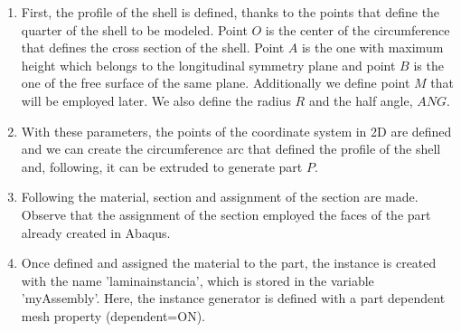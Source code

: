 \documentclass[english,a4paper,12pt]{article}
\begin{document}
\begin{enumerate}
\item
First, the profile of the shell is defined, thanks to the points that define the quarter of the shell to be modeled.
Point $O$ is the center of the circumference that defines the cross section of the shell. Point $A$ is the one with maximum height which belongs to the longitudinal symmetry plane and point $B$ is the one of the free surface of the same plane. Additionally we define point $M$ that will be employed later. We also define the radius $R$ and the half angle, $ANG$.
\item
With these parameters, the points of the coordinate system in 2D are defined and we can create the circumference arc that defined the profile of the shell and, following, it can be extruded to generate part $P$.
\item
Following the material, section and assignment of the section are made. Observe that the assignment of the section employed the faces of the part already created in Abaqus.
\item
Once defined and assigned the material to the part, the instance is created with the name 'laminainstancia', which is stored in the variable 'myAssembly'. Here, the instance generator is defined with a part dependent mesh property (dependent=ON).

\end{enumerate}
\end{document}

